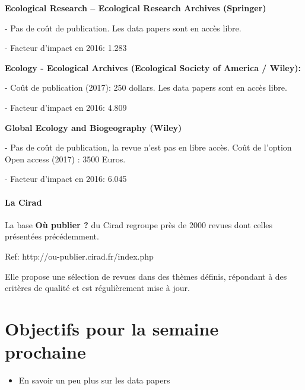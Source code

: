 \documentclass[11pt,oneside]{article}
\begin{document}
\begin{flushleft}
\textbf{Ecological Research – Ecological Research Archives (Springer) }
\end{flushleft}

-	Pas de coût de publication. Les data papers sont en accès libre.

-	Facteur d'impact en 2016: 1.283

\begin{flushleft}
\textbf{Ecology - Ecological Archives (Ecological Society of America / Wiley): }
\end{flushleft}

-	Coût de publication (2017): 250 dollars. Les data papers
sont en accès libre.

-	Facteur d'impact en 2016: 4.809

\begin{flushleft}
\textbf{Global Ecology and Biogeography (Wiley)}
\end{flushleft}

-	Pas de coût de publication, la revue n’est pas en libre accès. Coût de l’option Open access
(2017) : 3500 Euros.

-	Facteur d'impact en 2016: 6.045

\newpage

\subsection*{La Cirad}

\begin{flushleft}
La base \textbf{Où publier ?} du Cirad regroupe près de 2000 revues dont celles présentées précédemment.
\end{flushleft}


\begin{flushleft}
Ref: http://ou-publier.cirad.fr/index.php
\end{flushleft}

Elle propose une sélection de revues dans des thèmes définis, répondant à des critères de qualité et est régulièrement mise à jour.

\newpage
\part*{Objectifs pour la semaine prochaine}
\begin{itemize}
	\item En savoir un peu plus sur les data papers
\end{itemize}
\end{document}
